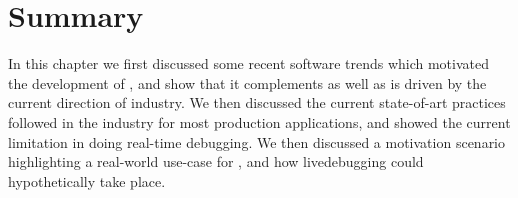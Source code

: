 

\section{Summary}

In this chapter we first discussed some recent software trends which motivated the development of \parikshan, and show that it complements as well as is driven by the current direction of industry. 
We then discussed the current state-of-art practices followed in the industry for most production applications, and showed the current limitation in doing real-time debugging.
We then discussed a motivation scenario highlighting a real-world use-case for \parikshan, and how livedebugging could hypothetically take place.


